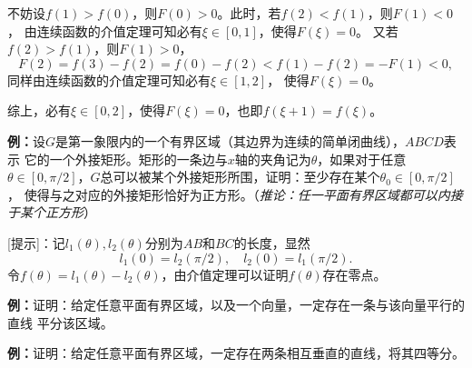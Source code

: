 不妨设$f(1)>f(0)$，则$F(0)>0$。此时，若$f(2)<f(1)$，则$F(1)<0$，
由连续函数的介值定理可知必有$\xi\in[0,1]$，使得$F(\xi)=0$。
又若$f(2)>f(1)$，则$F(1)>0$，
$$F(2)=f(3)-f(2)=f(0)-f(2)<f(1)-f(2)=-F(1)<0,$$
同样由连续函数的介值定理可知必有$\xi\in[1,2]$，
使得$F(\xi)=0$。

综上，必有$\xi\in[0,2]$，使得$F(\xi)=0$，也即$f(\xi+1)=f(\xi)$。

{\bf 例：}设$G$是第一象限内的一个有界区域（其边界为连续的简单闭曲线），$ABCD$表示
它的一个外接矩形。矩形的一条边与$x$轴的夹角记为$\theta$，如果对于任意$\theta\in
[0,\pi/2]$，$G$总可以被某个外接矩形所围，证明：至少存在某个$\theta_0\in[0,\pi/2]$，
使得与之对应的外接矩形恰好为正方形。（{\it 推论：任一平面有界区域都可以内接于某个正方形}）

\begin{center}
\end{center}

[提示]：记$l_1(\theta),l_2(\theta)$分别为$AB$和$BC$的长度，显然
$$l_1(0)=l_2(\pi/2),\quad l_2(0)=l_1(\pi/2).$$
令$f(\theta)=l_1(\theta)-l_2(\theta)$，由介值定理可以证明$f(\theta)$存在零点。

{\bf 例：}证明：给定任意平面有界区域，以及一个向量，一定存在一条与该向量平行的直线
平分该区域。

{\bf 例：}证明：给定任意平面有界区域，一定存在两条相互垂直的直线，将其四等分。

